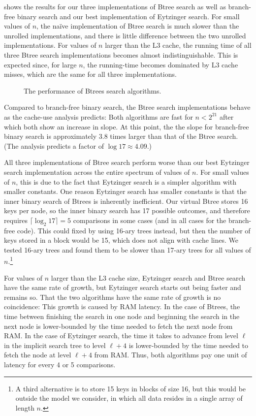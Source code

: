 \documentclass{patmorin}
\begin{document}
 shows the results for our three implementations of
Btree search as well as branch-free binary search and our best implementation
of Eytzinger search.  For small values of $n$, the na\"ive implementation
of Btree search is much slower than the unrolled implementations, and there
is little difference between the two unrolled implementations. For values
of $n$ larger than the L3 cache, the running time of all three Btree
search implementations becomes almost indistinguishable. This is expected
since, for large $n$, the running-time becomes dominated by L3 cache
misses, which are the same for all three implementations.

\begin{figure}
   \caption{The performance of Btrees search algorithms.}
\end{figure}


Compared to branch-free binary search, the Btree search implementations
behave as the cache-use analysis predicts:  Both algorithms are fast for
$n<2^{21}$ after which both show an increase in slope. At this point,
the the slope for branch-free binary search is approximately 3.8 times
larger than that of the Btree search. (The analysis predicts a factor
of $\log 17\approx 4.09$.)

All three implementations of Btree search perform worse than our best
Eytzinger search implementation across the entire spectrum of values
of $n$.  For small values of $n$, this is due to the fact that Eytzinger
search is a simpler algorithm with smaller constants.  One reason
Eytzinger search has smaller constants is that the inner binary search
of Btrees is inherently inefficient. Our virtual Btree stores 16 keys per
node, so the inner binary search has 17 possible outcomes, and therefore
requires $\lceil\log_2 17\rceil=5$ comparisons in some cases (and in
all cases for the branch-free code).  This could fixed by using 16-ary
trees instead, but then the number of keys stored in a block would be 15,
which does not align with cache lines.  We tested 16-ary trees and found
them to be slower than 17-ary trees for all values of $n$.\footnote{A
third alternative is to store 15 keys in blocks of size 16, but this would
be outside the model we consider, in which all data resides in a single
array of length $n$.}

For values of $n$ larger than the L3 cache size, Eytzinger search and
Btree search have the same rate of growth, but Eytzinger search starts
out being faster and remains so.  That the two algorithms have the same
rate of growth is no coincidence: This growth is caused by RAM latency.
In the case of Btrees, the time between finishing the search in one
node and beginning the search in the next node is lower-bounded by the
time needed to fetch the next node from RAM.  In the case of Eytzinger
search, the time it takes to advance from level $\ell$ in the implicit
search tree to level $\ell+4$ is lower-bounded by the time needed to fetch
the node at level $\ell+4$ from RAM.  Thus, both algorithms pay one unit of
latency for every 4 or 5 comparisons.
\end{document}
